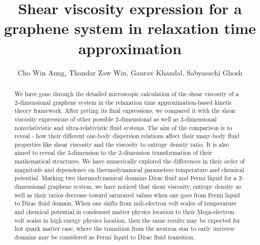 \documentclass[%
 reprint,
 amsmath,amssymb,
 aps,
]{revtex4-2}
\begin{document}
%
\title{Shear viscosity expression for a graphene system in relaxation time approximation}
%
\author{Cho Win Aung, Thandar Zaw Win, Gaurav Khandal, Sabyasachi Ghosh}
%
%
\begin{abstract}
We have gone through the detailed microscopic calculation of the shear viscosity of a 2-dimensional graphene system in the 
relaxation time approximation-based kinetic theory framework. After getting its final expressions, we compared
it with the shear viscosity expressions of other possible 2-dimensional as well as 3-dimensional nonrelativistic and 
ultra-relativistic fluid systems. The aim of the comparison is to reveal - how their different one-body dispersion relations
affect their many-body fluid properties like shear viscosity and the viscosity to entropy density ratio. It is also aimed to
reveal the 3-dimension to the 2-dimension transformation of their mathematical structures. We have numerically
explored the differences in their order of magnitude and dependence on thermodynamical parameters \textendash{} temperature and chemical
potential. Marking two thermodynamical domains \textendash{} Dirac fluid and Fermi liquid \textendash{} for a 2-dimensional graphene system, we have noticed
that shear viscosity, entropy density as well as their ratios decrease toward saturated values when one goes from Fermi liquid
to Dirac fluid domain. When one shifts from mili-electron volt scales of temperature and chemical potential in condensed matter physics
location to their Mega-electron volt scales in high energy physics location, then the same results may be expected for hot quark matter case,
where the transition from the neutron star to early universe domains may be considered as Fermi liquid to Dirac fluid transition. 



\end{abstract}
\end{document}
